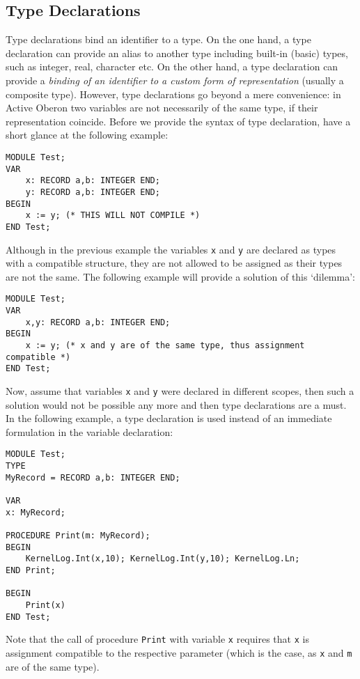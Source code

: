\documentclass[a4paper,11pt]{article}
\begin{document}
\subsection{Type Declarations}
Type declarations bind an identifier to a type. On the one hand, a type declaration can provide an alias to another type including built-in (basic) types, such as integer, real, character etc. On the other hand, a type declaration can provide a {\em binding of an identifier to a custom form of representation} (usually a composite type). However, type declarations go beyond a mere convenience: in Active Oberon two variables are not necessarily of the same type, if their representation coincide. Before we provide the syntax of type declaration, have a short glance at the following example:
\begin{lstlisting}[language=Oberon,frame=none,caption={Incompatible types}]
MODULE Test;
VAR
    x: RECORD a,b: INTEGER END;
    y: RECORD a,b: INTEGER END;
BEGIN
    x := y; (* THIS WILL NOT COMPILE *)
END Test;
\end{lstlisting}
Although in the previous example the variables \verb+x+ and \verb+y+ are declared as types with a compatible structure, they are not allowed to be assigned as their types are not the same. The following example will provide a solution of this `dilemma':
\begin{lstlisting}[language=Oberon,frame=none,caption={Same Types}]
MODULE Test;
VAR
    x,y: RECORD a,b: INTEGER END;
BEGIN
    x := y; (* x and y are of the same type, thus assignment compatible *)
END Test;
\end{lstlisting}
Now, assume that variables \verb+x+ and \verb+y+ were declared in different scopes, then such a solution would not be possible any more and then type declarations are a must. In the following example, a type declaration is used instead of an immediate formulation in the variable declaration:
\begin{lstlisting}[language=Oberon,frame=none,caption={Using type declarations}]
MODULE Test;
TYPE
MyRecord = RECORD a,b: INTEGER END;

VAR
x: MyRecord;

PROCEDURE Print(m: MyRecord);
BEGIN
    KernelLog.Int(x,10); KernelLog.Int(y,10); KernelLog.Ln;
END Print;

BEGIN
    Print(x)
END Test;
\end{lstlisting}
Note that the call of procedure \verb+Print+ with variable \verb+x+ requires that \verb+x+ is assignment compatible to the respective parameter (which is the case, as \verb+x+ and \verb+m+ are of the same type).
\end{document}
